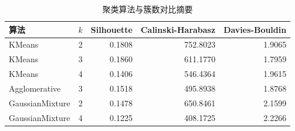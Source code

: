 \begin{table}[H]
\centering
\caption{聚类算法与簇数对比摘要}
\label{tab:clustering-model-comparison}
\begin{tabular}{lrrrr}
\toprule
算法 & $k$ & Silhouette & Calinski-Harabasz & Davies-Bouldin \\
\midrule
KMeans & 2 & 0.1808 & 752.8023 & 1.9065 \\
KMeans & 3 & 0.1860 & 611.1770 & 1.7959 \\
KMeans & 4 & 0.1406 & 546.4364 & 1.9615 \\
Agglomerative & 3 & 0.1518 & 495.8938 & 1.8768 \\
GaussianMixture & 2 & 0.1478 & 650.8461 & 2.1599 \\
GaussianMixture & 4 & 0.1225 & 408.1725 & 2.2266 \\
\bottomrule
\end{tabular}
\end{table}
